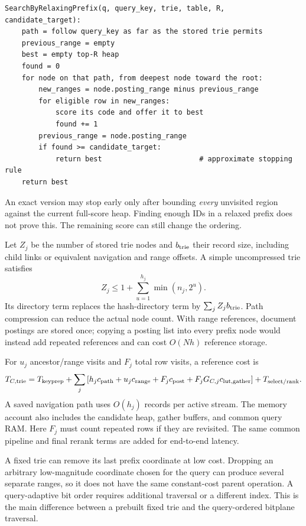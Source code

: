 \par\noindent\begin{minipage}{\linewidth}
\begin{lstlisting}[caption={A fixed-prefix relaxation variant of Approach C.}]
SearchByRelaxingPrefix(q, query_key, trie, table, R, candidate_target):
    path = follow query_key as far as the stored trie permits
    previous_range = empty
    best = empty top-R heap
    found = 0
    for node on that path, from deepest node toward the root:
        new_ranges = node.posting_range minus previous_range
        for eligible row in new_ranges:
            score its code and offer it to best
            found += 1
        previous_range = node.posting_range
        if found >= candidate_target:
            return best                       # approximate stopping rule
    return best
\end{lstlisting}
\end{minipage}\par
An exact version may stop early only after bounding \emph{every} unvisited region against the
current full-score heap. Finding enough IDs in a relaxed prefix does not prove this.
The remaining score can still change the ordering.

Let $Z_j$ be the number of stored trie nodes and $b_{\rm trie}$ their record size, including
child links or equivalent navigation and range offsets. A simple uncompressed trie satisfies
\[
Z_j\leq 1+\sum_{u=1}^{h_j}\min(n_j,2^u).
\]
Its directory term replaces the hash-directory term by $\sum_j Z_jb_{\rm trie}$. Path compression
can reduce the actual node count. With range references, document postings are stored once;
copying a posting list into every prefix node would instead add repeated references and can
cost $O(Nh)$ reference storage.

For $u_j$ ancestor/range visits and $F_j$ total row visits, a reference cost is
\begin{equation}
T_{C,\rm trie}=T_{\rm keyprep}+
\sum_j\left[h_jc_{\rm path}+u_jc_{\rm range}+F_jc_{\rm post}
 +F_jG_{C,j}c_{\rm lut,gather}\right]+T_{\rm select/rank}.
\label{eq:trie-cost}
\end{equation}
A saved navigation path uses $O(h_j)$ records per active stream. The memory account also includes the candidate heap,
gather buffers, and common query RAM. Here $F_j$ must count repeated rows if they are revisited.
The same common pipeline and final rerank terms are added for end-to-end latency.

A fixed trie can remove its last prefix coordinate at low cost. Dropping an arbitrary
low-magnitude coordinate chosen for the query can produce several separate ranges, so it does not
have the same constant-cost parent operation. A query-adaptive bit order requires additional
traversal or a different index. This is the main difference between a prebuilt fixed trie and
the query-ordered bitplane traversal.

